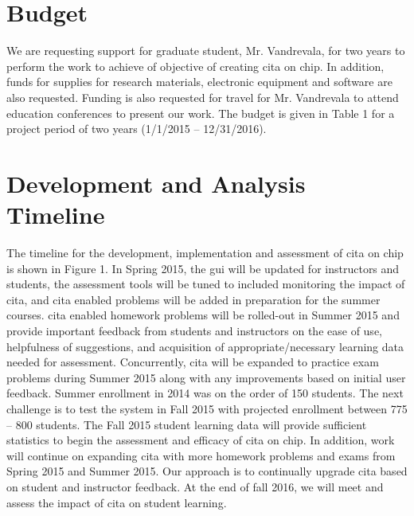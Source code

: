 \section{Budget}

We are requesting support for graduate student, Mr. Vandrevala, for two years to perform the
work to achieve of objective of creating \gls{cita} on \gls{chip}. In addition, funds for supplies for
research materials, electronic equipment and software are also requested. Funding is also
requested for travel for Mr. Vandrevala to attend education conferences to present our work.
The budget is given in Table 1 for a project period of two years (1/1/2015 – 12/31/2016).

\section{Development and Analysis Timeline}

The timeline for the development, implementation and assessment of \gls{cita} on \gls{chip} is shown in Figure 1. In Spring 2015, the \gls{gui} will be updated for instructors and students, the assessment tools will be tuned to included monitoring the impact of \gls{cita}, and \gls{cita} enabled problems will be added in preparation for the summer courses. \gls{cita} enabled homework problems will be rolled-out in Summer 2015 and provide important feedback from students and instructors on the ease of use, helpfulness of suggestions, and acquisition of appropriate/necessary learning data needed for assessment. Concurrently, \gls{cita} will be expanded to practice exam problems during Summer 2015 along with any improvements based on initial user feedback. Summer enrollment in 2014 was on the order of 150 students. The next challenge is to test the system in Fall 2015 with projected enrollment between 775 – 800 students. The Fall 2015 student learning data will provide sufficient statistics to begin the assessment and efficacy of \gls{cita} on \gls{chip}. In addition, work will continue on expanding \gls{cita} with more homework problems and exams from Spring 2015 and Summer 2015. Our approach is to continually upgrade \gls{cita} based on student and instructor feedback. At the end of fall 2016, we will meet and assess the impact of \gls{cita} on student learning.

